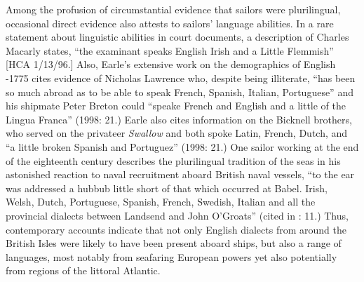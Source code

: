 Among the profusion of circumstantial evidence that sailors were plurilingual, occasional direct evidence also attests to sailors’ language abilities. In a rare statement about linguistic abilities in court documents, a description of Charles Macarly states, “the examinant speaks English Irish and a Little Flemmish” [HCA 1/13/96.] Also, Earle’s extensive work on the demographics of English \citealt{Sailors1570}-1775 cites evidence of Nicholas Lawrence who, despite being illiterate, “has been so much abroad as to be able to speak French, Spanish, Italian, Portuguese” and his shipmate Peter Breton could “speake French and English and a little of the Lingua Franca” (1998: 21.) Earle also cites information on the Bicknell brothers, who served on the privateer \textit{Swallow} and both spoke Latin, French, Dutch, and “a little broken Spanish and Portuguez” (1998: 21.) One sailor working at the end of the eighteenth century describes the plurilingual tradition of the seas in his astonished reaction to naval recruitment aboard British naval vessels, “to the ear was addressed a hubbub little short of that which occurred at Babel. Irish, Welsh, Dutch, Portuguese, Spanish, French, Swedish, Italian and all the provincial dialects between Landsend and John O’Groats” (cited in \citealt{AdkinsAdkins2008}: 11.) Thus, contemporary accounts indicate that not only English dialects from around the British Isles were likely to have been present aboard ships, but also a range of languages, most notably from seafaring European powers yet also potentially from regions of the littoral Atlantic. 

